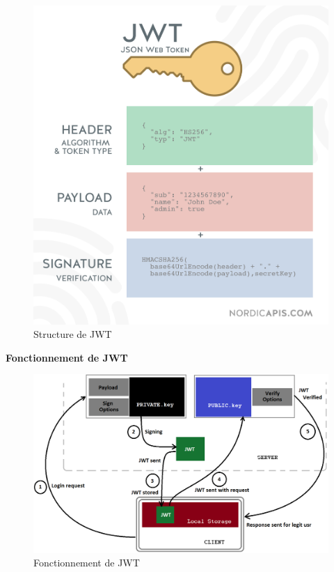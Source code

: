 \begin{itemize}
\begin{itemize}
\end{itemize}
	\begin{figure}[H]
	\centering
	\includegraphics[scale=0.09]{jwt2.png}
	\caption{Structure de JWT}
	\label{Structure de JWT}
\end{figure} 
\newpage
\textbf{Fonctionnement de JWT}
	\begin{figure}[H]
	\centering
	\includegraphics[scale=0.2]{jwt.png}
	\caption{Fonctionnement de JWT}
	\label{Fonctionnement de JWT}
\end{figure} 


\end{itemize}
